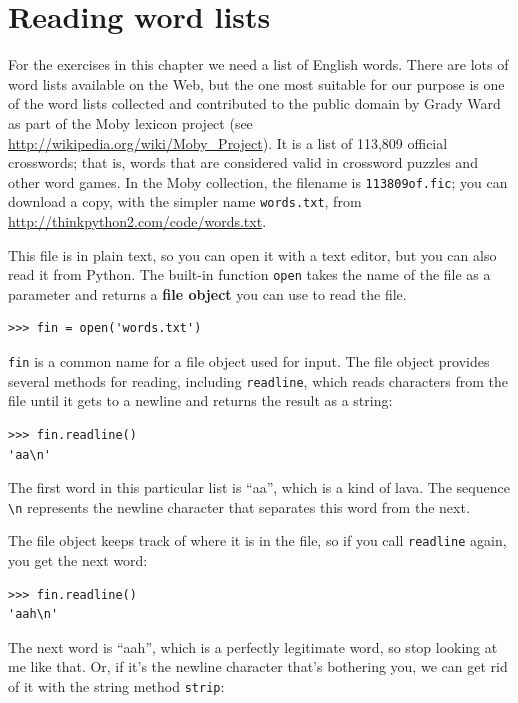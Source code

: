 \documentclass[10pt]{book}
\begin{document}
\section{Reading word lists}
\label{wordlist}

For the exercises in this chapter we need a list of English words.
There are lots of word lists available on the Web, but the one most
suitable for our purpose is one of the word lists collected and
contributed to the public domain by Grady Ward as part of the Moby
lexicon project (see \url{http://wikipedia.org/wiki/Moby_Project}).  It
is a list of 113,809 official crosswords; that is, words that are
considered valid in crossword puzzles and other word games.  In the
Moby collection, the filename is {\tt 113809of.fic}; you can download
a copy, with the simpler name {\tt words.txt}, from
\url{http://thinkpython2.com/code/words.txt}.

This file is in plain text, so you can open it with a text
editor, but you can also read it from Python.  The built-in
function {\tt open} takes the name of the file as a parameter
and returns a {\bf file object} you can use to read the file.

\begin{verbatim}
>>> fin = open('words.txt')
\end{verbatim}
%
{\tt fin} is a common name for a file object used for input.  The file
object provides several methods for reading, including {\tt readline},
which reads characters from the file until it gets to a newline and
returns the result as a string: 

\begin{verbatim}
>>> fin.readline()
'aa\n'
\end{verbatim}
%
The first word in this particular list is ``aa'', which is a kind of
lava.  The sequence \verb"\n" represents the newline character that
separates this word from the next.

The file object keeps track of where it is in the file, so
if you call {\tt readline} again, you get the next word:

\begin{verbatim}
>>> fin.readline()
'aah\n'
\end{verbatim}
%
The next word is ``aah'', which is a perfectly legitimate
word, so stop looking at me like that.
Or, if it's the newline character that's bothering you,
we can get rid of it with the string method {\tt strip}:
\end{document}
